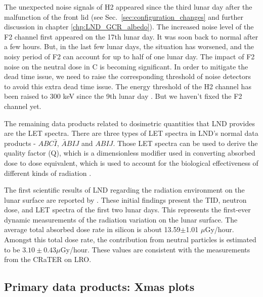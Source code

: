 The unexpected noise signals of H2 appeared since the third lunar day after the malfunction of the front lid (see Sec.~\ref{sec:configuration_changes} and further discussion in chapter \ref{chp:LND_GCR_albedo}). The increased noise level of the F2 channel first appeared on the 17th lunar day. It was soon back to normal after a few hours. But, in the last few lunar days, the situation has worsened, and the noisy period of F2 can account for up to half of one lunar day. The impact of F2 noise on the neutral dose in C is becoming significant. In order to mitigate the dead time issue, we need to raise the corresponding threshold of noise detectors to avoid this extra dead time issue. The energy threshold of the H2 channel has been raised to 300 keV since the 9th lunar day \citep{Xu2022FrASS}. But we haven't fixed the F2 channel yet.


The remaining data products related to dosimetric quantities that \ac{LND} provides are the \ac{LET} spectra. There are three types of \ac{LET} spectra in \ac{LND}'s normal data products - $ABC\bar{I}$, $\bar{A}BIJ$ and $ABIJ$. Those \ac{LET} spectra can be used to derive the quality factor (Q), which is a dimensionless modifier used in converting absorbed dose to dose equivalent, which is used to account for the biological effectiveness of different kinds of radiation \citep{Kerr1988Qualityfacgtor}.


The first scientific results of \ac{LND} regarding the radiation environment on the lunar surface are reported by \citet{Zhang2020SciAdv}. These initial findings present the \ac{TID}, neutron dose, and \ac{LET} spectra of the first two lunar days. This represents the first-ever dynamic measurements of the radiation variation on the lunar surface. The average total absorbed dose rate in silicon is about 13.59$\pm$1.01 $\mu$Gy/hour. Amongst this total dose rate, the contribution from neutral particles is estimated to be $3.10 \pm 0.43 \mu$Gy/hour. These values are consistent with the measurements from the \ac{CRaTER} on \ac{LRO}.



\subsection*{Primary data products: Xmas plots}
\label{sec:xmas}

